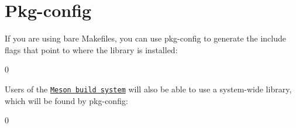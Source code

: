 \chapter{Pkg-\/config }
\hypertarget{md_include_2nlohman_2json-develop_2docs_2mkdocs_2docs_2integration_2pkg-config}{}\label{md_include_2nlohman_2json-develop_2docs_2mkdocs_2docs_2integration_2pkg-config}
\label{md_include_2nlohman_2json-develop_2docs_2mkdocs_2docs_2integration_2pkg-config_autotoc_md1856}%
%


If you are using bare Makefiles, you can use {\ttfamily pkg-\/config} to generate the include flags that point to where the library is installed:\+


\begin{DoxyCode}{0}

\end{DoxyCode}


Users of the \href{package_managers.md\#meson}{\texttt{Meson build system}} will also be able to use a system-\/wide library, which will be found by {\ttfamily pkg-\/config}:\+


\begin{DoxyCode}{0}

\end{DoxyCode}
 